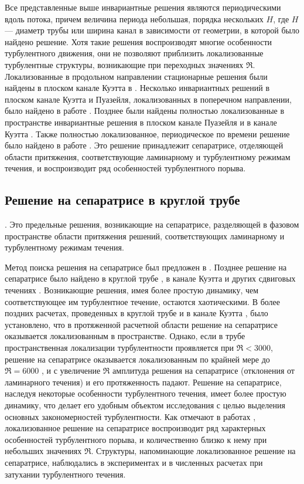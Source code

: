 Все представленные выше инвариантные решения являются периодическими вдоль потока, причем величина периода небольшая, порядка нескольких $H$, где $H$ --- диаметр трубы или ширина канал в зависимости от геометрии, в которой было найдено решение. Хотя такие решения воспроизводят многие особенности турбулентного движения, они не позволяют приблизить локализованные турбулентные структуры, возникающие при переходных значениях $\Re$. Локализованные в продольном направлении стационарные решения были найдены в плоском канале Куэтта в \cite{Cherhabili1997, Ehrenstein2008, Schneider2010}. Несколько инвариантных решений в плоском канале Куэтта и Пуазейля, локализованных в поперечном направлении, было найдено в работе \cite{Gibson2014}. Позднее были найдены полностью локализованные в пространстве инвариантные решения в плоском канале Пуазейля \cite{Zammert2014} и в канале Куэтта \cite{Brand2014}. Также полностью локализованное, периодическое по времени решение было найдено в работе \cite{Avila2013}. Это решение принадлежит сепаратрисе, отделяющей области притяжения, соответствующие ламинарному и турбулентному режимам течения, и воспроизводит ряд особенностей турбулентного порыва. 


	\subsection{Решение на сепаратрисе в круглой трубе}

. Это предельные решения, возникающие на сепаратрисе, разделяющей в фазовом пространстве области притяжения решений, соответствующих ламинарному и турбулентному режимам течения. 


Метод поиска решения на сепаратрисе был предложен в \cite{Skufca2006}. Позднее решение на сепаратрисе было найдено в круглой трубе \cite{Schneider2007}, в канале Куэтта \cite{Schneider2008} и других сдвиговых течениях \cite{Kreilos2013}. Возникающие решения, имея более простую динамику, чем соответствующее им турбулентное течение, остаются хаотическими. В более поздних расчетах, проведенных в круглой трубе \cite{Mellibovsky2009transition} и в канале Куэтта \cite{Duguet2009}, было установлено, что в протяженной расчетной области решение на сепаратрисе оказывается локализованным в пространстве. Однако, если в трубе пространственная локализации турбулентности проявляется при $\Re < 3000$, решение на сепаратрисе оказывается локализованным по крайней мере до $\Re = 6000$ \cite{Duguet2010}, и с увеличение $\Re$ амплитуда решения на сепаратрисе (отклонения от ламинарного течения) и его протяженность падают. Решение на сепаратрисе, наследуя некоторые особенности турбулентного течения, имеет более простую динамику, что делает его удобным объектом исследования с целью выделения основных закономерностей турбулентности. Как отмечают в работах \cite{Duguet2010, Avila2013}, локализованное решение на сепаратрисе воспроизводит ряд характерных особенностей турбулентного порыва, и количественно близко к нему при небольших значениях $\Re$. Структуры, напоминающие локализованное решение на сепаратрисе, наблюдались в экспериментах \cite{deLozar2012} и в численных расчетах \cite{Manneville2011} при затухании турбулентного течения. 

